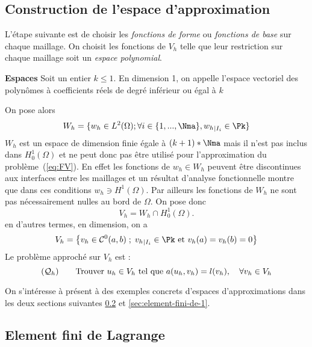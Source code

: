 \subsection{Construction de l'espace d'approximation}
\label{sec:constr-de-lesp}

L'étape suivante est de choisir les \emph{fonctions de forme} ou
\emph{fonctions de base} sur chaque maillage. On choisit les fonctions de
$V_h$ telle que leur restriction sur chaque maillage soit un \emph{espace
polynomial}.

\begin{definition}{\textbf{Espaces \Pk}}
  \label{def:24}
  Soit un entier $k \leq 1$. En dimension 1, on appelle \Pk l'espace vectoriel
  des polynômes à coefficients réels de degré inférieur ou égal à $k$
\end{definition}

On pose alors
\begin{equation}
  \label{eq:2}
  W_h = \{w_h \in L^2(\Omega); \forall i \in \{ 1,...,\Nma\}, {w_h}_{|I_i} \in \Pk\}
\end{equation}
$W_h$ est un espace de dimension finie égale à $(k+1)*\Nma$ mais il n'est pas
inclus dans $H^1_0(\Omega)$ et ne peut donc pas être utilisé pour
l'approximation du problème~(\ref{eq:FV}). En effet les fonctions de $w_h \in W_h$
peuvent être discontinues aux interfaces entre les maillages et un résultat
d'analyse fonctionnelle montre que dans ces conditions $w_h \ni
H^1(\Omega)$. Par ailleurs les fonctions de $W_h$ ne sont pas nécessairement
nulles au bord de $\Omega$. On pose donc
\begin{equation}
  \label{eq:3}
  V_h = W_h \cap H^1_0(\Omega).
\end{equation}
en d'autres termes, en dimension, on a
\begin{equation}
  \label{eq:5}
  V_h = \left\{ v_h \in {\cal C}^0 (a,b) \; ; \; {v_h}_{|I_i} \in \Pk \hbox{ et } v_h(a)=v_h(b)=0 \right\}
\end{equation}
%
Le problème approché sur $V_h$ est :
\begin{equation}
  \label{eq:11}
  ({\cal Q}_h)\qquad \hbox{Trouver } u_h\in V_h \hbox{ tel que } a(u_h,v_h)=l(v_h), \quad\forall v_h\in V_h
\end{equation}

On s'intéresse à présent à des exemples concrets d'espaces d'approximations
dans les deux sections suivantes \ref{sec:element-fini-de} et
\ref{sec:element-fini-de-1}.

\subsection{Element fini de Lagrange \Pk[1]}
\label{sec:element-fini-de}

